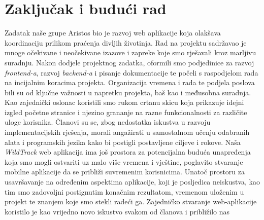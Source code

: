 \chapter{Zaključak i budući rad}
		
Zadatak naše grupe Aristos bio je razvoj web aplikacije koja olakšava koordinaciju prilikom 
praćenja divljih životinja. Rad na projektu sadržavao je mnoge očekivane i neočekivane izazove 
i zapreke koje smo rješavali kroz marljivu suradnju.
\newline Nakon dodjele projektnog zadatka, oformili smo podjedinice za razvoj \textit{frontend-a}, razvoj 
\textit{backend-a} i pisanje dokumentacije te počeli s raspodjelom rada na incijalnim koracima projekta.
 Organizacija vremena i rada te podjela poslova bili su od ključne važnosti u napretku projekta, 
 baš kao i međusobna suradnja. 
 Kao zajednički oslonac koristili smo rukom crtanu skicu koja prikazuje idejni izgled početne stranice 
 i njezino grananje na razne funkcionalnosti za različite uloge korisnika. Članovi su se, zbog 
 nedostatka iskustva u razvoju implementacijskih rješenja, morali angažirati u samostalnom učenju 
 odabranih alata i programskih jezika kako bi postigli postavljene ciljeve i rokove. 
\newline Naša \textit{WildTrack} web aplikacija ima još prostora za potencijalna buduća unapređenja 
koja smo mogli ostvariti uz malo više vremena i vještine, poglavito stvaranje mobilne aplikacije 
da se približi suvremenim korisnicima. 
\newline Unatoč prostoru za usavršavanje na određenim aspektima aplikacije, 
koji je posljedica neiskustva, kao tim smo zadovoljni postignutim konačnim rezultatom, 
vremenom uloženim u projekt te znanjem koje smo stekli radeći ga. 
Zajedničko stvaranje web-aplikacije koristilo je kao vrijedno novo iskustvo svakom od članova i približilo nas 
		\eject 